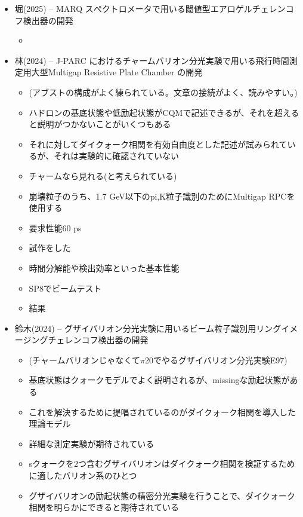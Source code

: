 \documentclass[../main.tex]{subfiles}
\begin{document}
\begin{tcolorbox}[
  title=過去の修論の切り口,
  colback=yellow!8,
  colframe=black!30,
  breakable
]
\begin{itemize}
  \item 堀(2025) -- MARQ スぺクトロメータで用いる閾値型エアロゲルチェレンコフ検出器の開発
  \begin{itemize}
    \item 
  \end{itemize}
  \item 林(2024) -- J-PARC におけるチャームバリオン分光実験で用いる飛行時間測定用大型Multigap Resistive Plate Chamber の開発
  \begin{itemize}
    \item (アブストの構成がよく練られている。文章の接続がよく、読みやすい。)
    \item ハドロンの基底状態や低励起状態がCQMで記述できるが、それを超えると説明がつかないことがいくつもある
    \item それに対してダイクォーク相関を有効自由度とした記述が試みられているが、それは実験的に確認されていない
    \item チャームなら見れる(と考えられている)
    \item 崩壊粒子のうち、1.7 \si{\giga\electronvolt}以下のpi,K粒子識別のためにMultigap RPCを使用する
    \item 要求性能60 \si{\pico\second}
    \item 試作をした
    \item 時間分解能や検出効率といった基本性能
    \item SP8でビームテスト
    \item 結果
  \end{itemize}
  \item 鈴木(2024) -- グザイバリオン分光実験に用いるビーム粒子識別用リングイメージングチェレンコフ検出器の開発
  \begin{itemize}
    \item (チャームバリオンじゃなくて$\pi$20でやるグザイバリオン分光実験E97)
    \item 基底状態はクォークモデルでよく説明されるが、missingな励起状態がある
    \item これを解決するために提唱されているのがダイクォーク相関を導入した理論モデル
    \item 詳細な測定実験が期待されている
    \item sクォークを2つ含むグザイバリオンはダイクォーク相関を検証するために適したバリオン系のひとつ
    \item グザイバリオンの励起状態の精密分光実験を行うことで、ダイクォーク相関を明らかにできると期待されている

\end{itemize}
\end{itemize}
\end{tcolorbox}
\end{document}
